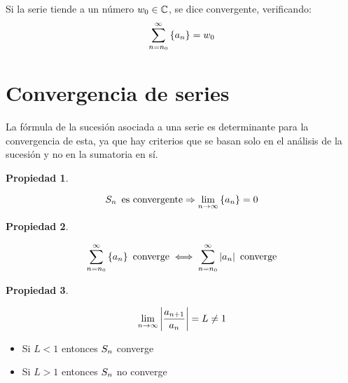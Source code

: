 \documentclass[a5paper,12pt,twoside]{book}
\newtheorem{prop}{{Propiedad}}[chapter]
\begin{document}
Si la serie tiende a un número $w_0 \in \mathbb{C}$, se dice convergente, verificando:
\begin{equation*}
    \sum_{n=n_0}^ \infty { \left\{ {a_n} \right\} } = w_0
\end{equation*}


\section{Convergencia de series}

La fórmula de la sucesión asociada a una serie es determinante para la convergencia de esta, ya que hay criterios que se basan solo en el análisis de la sucesión y no en la sumatoria en sí.

\begin{mdframed}[style=MyFrame1]
    \begin{prop}
    \end{prop}
    \begin{equation*}
        S_n \enspace \textrm{es convergente} \Rightarrow \lim_{n\to\infty} { \left\{ {a_n} \right\} } = 0
    \end{equation*}
\end{mdframed}

\begin{mdframed}[style=MyFrame1]
    \begin{prop}
    \end{prop}
    \begin{equation*}
        \sum_{n=n_0}^\infty { \left\{ {a_n} \right\} } \enspace \textrm{converge} \iff \sum_{n=n_0}^\infty {\left| {a_n} \right|} \enspace \textrm{converge}
    \end{equation*}
\end{mdframed}

\begin{mdframed}[style=MyFrame1]
    \begin{prop}
        \label{prop:DAlembert}
    \end{prop}
    \begin{equation*}
        \lim_{n\to\infty} {\left| {\frac{a_{n+1}}{a_n}} \right|} = L \neq 1
    \end{equation*}
    \begin{itemize}
        \item Si $L<1$ entonces $S_n$ converge
        \item Si $L>1$ entonces $S_n$ no converge
    \end{itemize}
\end{mdframed}
\end{document}
